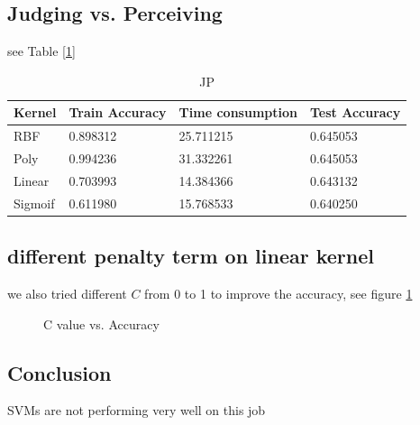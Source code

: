 \documentclass{article}
\begin{document}
\subsection{Judging  vs. Perceiving }

see Table [\ref{JP}]

\begin{table}
  \caption{JP}
  \label{JP}
  \centering
  \begin{tabular}{llll}
    \toprule
    \cmidrule(r){1-2}
    Kernel     & Train Accuracy   & Time consumption  & Test Accuracy  \\
    \midrule
    RBF & 0.898312	  & 25.711215 &   0.645053  \\
    Poly     & 0.994236 & 31.332261 &  0.645053    \\
    Linear     & 0.703993	& 14.384366      & 0.643132  \\
    Sigmoif & 0.611980 & 15.768533 & 0.640250\\
    \bottomrule
  \end{tabular}
\end{table}

\subsection{different penalty term on linear kernel}
we also tried different $C$ from 0 to 1 to improve the accuracy, see figure \ref{fig:C}
\begin{figure}
  
  \centering
  \caption{ C value vs. Accuracy}
  \label{fig:C}
\end{figure} 
\subsection{Conclusion}
SVMs are not performing very well on this job
\end{document}

